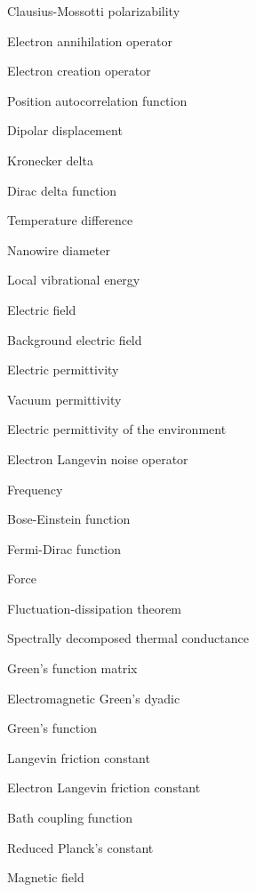 \documentclass[dissertation,draft*]{aaltoseries}
\begin{document}
\begin{description} \itemsep2pt
  \item[$\alpha^{\textrm{CM}}$] Clausius-Mossotti polarizability
  \item[$c$] Electron annihilation operator 
  \item[$c^{\dagger}$] Electron creation operator 
  \item[$C$] Position autocorrelation function
  \item[$d$] Dipolar displacement 
  \item[$\delta_{ij}$] Kronecker delta
   \item[$\delta(x-x')$] Dirac delta function
  \item[$\Delta T$] Temperature difference
  \item[$D$] Nanowire diameter
    \item[$e$] Local vibrational energy
   \item[$E$] Electric field  
   \item[$E_{\textrm{env}}$] Background electric field
   \item[$\varepsilon$] Electric permittivity
   \item[$\varepsilon_0$] Vacuum permittivity
   \item[$\varepsilon_{\textrm{env}}$] Electric permittivity of the environment
   \item[$\eta$] Electron Langevin noise operator
   \item[$f$] Frequency
   \item[$f_{\textrm{BE}}$] Bose-Einstein function
   \item[$f_{\textrm{FD}}$] Fermi-Dirac function
  \item[$F$] Force
   \item[FDT] Fluctuation-dissipation theorem
  \item[$g$] Spectrally decomposed thermal conductance
  \item[$G$] Green's function matrix
  \item[$\mathbb{G}$] Electromagnetic Green's dyadic
  \item[GF] Green's function 
  \item[$\gamma$] Langevin friction constant
  \item[$\gamma_e$] Electron Langevin friction constant
  \item[$\Gamma$] Bath coupling function
  \item[$\hbar$] Reduced Planck's constant
  \item[$H$] Magnetic field 

\end{description}
\end{document}
